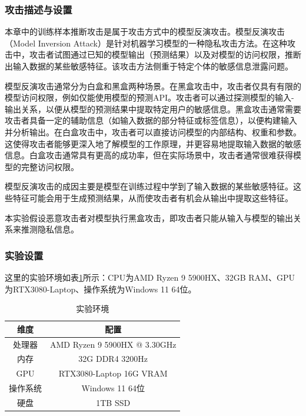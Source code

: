 \subsubsection{攻击描述与设置}

本章中的训练样本推断攻击是属于攻击方式中的模型反演攻击。模型反演攻击（Model Inversion Attack）是针对机器学习模型的一种隐私攻击方法。在这种攻击中，攻击者试图通过已知的模型输出（预测结果）以及对模型的访问权限，推断出输入数据的某些敏感特征。该攻击方法侧重于特定个体的敏感信息泄露问题。

模型反演攻击通常分为白盒和黑盒两种场景。在黑盒攻击中，攻击者仅具有有限的模型访问权限，例如仅能使用模型的预测API。攻击者可以通过探测模型的输入-输出关系，以便从模型的预测结果中提取特定用户的敏感信息。黑盒攻击通常需要攻击者具备一定的辅助信息（如输入数据的部分特征或标签信息），以便构建输入并分析输出。在白盒攻击中，攻击者可以直接访问模型的内部结构、权重和参数。这使得攻击者能够更深入地了解模型的工作原理，并更容易地提取输入数据的敏感信息。白盒攻击通常具有更高的成功率，但在实际场景中，攻击者通常很难获得模型的完整访问权限。

模型反演攻击的成因主要是模型在训练过程中学到了输入数据的某些敏感特征。这些特征可能会用于生成预测结果，从而使攻击者有机会从输出中提取这些特征。

本实验假设恶意攻击者对模型执行黑盒攻击，即攻击者只能从输入与模型的输出关系来推测隐私信息。

\subsubsection{实验设置}

这里的实验环境如表\ref{chap3_exp1_env}所示：CPU为AMD Ryzen 9 5900HX、32GB RAM、GPU为RTX3080-Laptop、操作系统为Windows 11 64位。

\begin{table}[]
	\centering
	\caption{实验环境}
	\begin{tabular}{|c|c|}
		\hline
		维度&配置
		\\ \hline
		
		处理器&AMD Ryzen 9 5900HX @ 3.30GHz    \\ \hline
		内存&32G DDR4 3200Hz    \\ \hline
		GPU&RTX3080-Laptop 16G VRAM    \\ \hline
		操作系统&Windows 11 64位    \\ \hline
		硬盘&1TB SSD    \\ \hline
	\end{tabular}
	\label{chap3_exp1_env}
\end{table}

